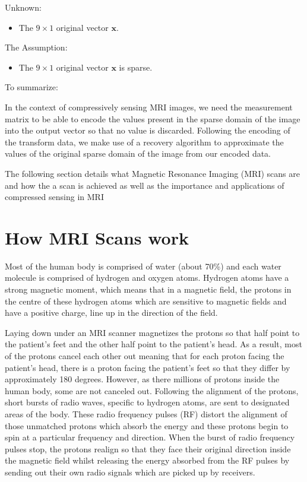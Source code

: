 \documentclass[titlepage,oneside, 12pt]{book}
\theoremstyle{break}
\begin{document}
Unknown: 
\begin{itemize}
\item The $ 9 \times 1$ original vector $\textbf{x}$.
\end{itemize}

The Assumption: 
\begin{itemize}
\item The $ 9 \times 1$ original vector $\textbf{x}$ is sparse.
\end{itemize}

\begin{flushleft}
To summarize:
\end{flushleft}
In the context of compressively sensing MRI images, we need the measurement matrix to be able to encode the values present in the sparse domain of the image into the output vector so that no value is discarded. Following the encoding of the transform data, we make use of a recovery algorithm to approximate the values of the original sparse domain of the image from our encoded data. 

The following section details what Magnetic Resonance Imaging (MRI) scans are and how the a scan is achieved as well as the importance and applications of compressed sensing in MRI 

\newpage

\section{How MRI Scans work}
Most of the human body is comprised of water (about 70\%) and each water molecule is comprised of hydrogen and oxygen atoms. Hydrogen atoms have a strong magnetic moment, which means that in a magnetic field, the protons in the centre of these hydrogen atoms which are sensitive to magnetic fields and have a positive charge, line up in the direction of the field. 
 
Laying down under an MRI scanner magnetizes the protons so that half point to the patient's feet and the other half point to the patient's head. As a result, most of the protons cancel each other out meaning that for each proton facing the patient's head, there is a proton facing the patient's feet so that they differ by approximately 180 degrees. However, as there millions of protons inside the human body, some are not canceled out.  Following the alignment of the protons, short bursts of radio waves, specific to hydrogen atoms, are sent to designated areas of the body. These radio frequency pulses (RF) distort the alignment of those unmatched protons which absorb the energy and these protons begin to spin at a particular frequency and direction. When the burst of radio frequency pulses stop, the protons realign so that they face their original direction inside the magnetic field whilst releasing the energy absorbed from the RF pulses by sending out their own radio signals which are picked up by receivers.\cite{NHS-MRI}
\end{document}
